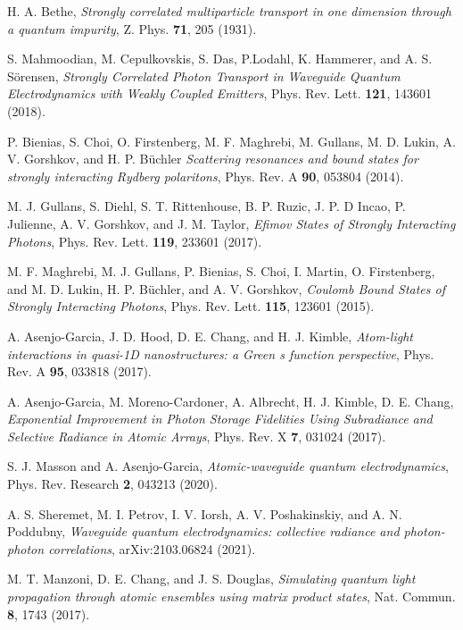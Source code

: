 \documentclass[pra,twocolumn,showpacs,preprintnumbers,amsmath,amssymb]{revtex4-1}
\begin{document}
\begin{thebibliography}{99}
 H. A. Bethe,  \textit{Strongly correlated multiparticle
transport in one dimension through a quantum impurity},   
Z. Phys.  {\bf 71}, 205 (1931).  

 S. Mahmoodian, M. Cepulkovskis, S. Das, P.Lodahl, K. Hammerer, and A. S. S\"orensen, \textit{Strongly Correlated Photon Transport in Waveguide Quantum Electrodynamics with Weakly Coupled Emitters}, Phys. Rev. Lett. {\bf 121}, 143601 (2018).


 P. Bienias, S. Choi, O. Firstenberg, M. F. Maghrebi, M. Gullans, M. D. Lukin, A. V. Gorshkov, and H. P. B\"uchler \textit{Scattering resonances and bound states for strongly interacting Rydberg polaritons},   Phys. Rev. A {\bf 90}, 053804 (2014).

 M. J. Gullans, S. Diehl, S. T. Rittenhouse, B. P. Ruzic, J. P. D Incao, P. Julienne, A. V. Gorshkov, and J. M. Taylor,  \textit{Efimov States of Strongly Interacting Photons}, Phys. Rev. Lett.  {\bf 119}, 233601 (2017).

 M. F. Maghrebi, M. J. Gullans, P. Bienias, S. Choi, I. Martin, O. Firstenberg, and
M. D. Lukin, H. P. B\"uchler,  and A. V. Gorshkov,  \textit{Coulomb Bound States of Strongly Interacting Photons},   Phys. Rev. Lett.  {\bf 115}, 123601 (2015).





 A. Asenjo-Garcia, J. D. Hood,  D. E. Chang, and H. J. Kimble, \textit{Atom-light interactions in quasi-1D nanostructures: a Green s function perspective}, Phys. Rev. A  {\bf95}, 033818 (2017).

 A. Asenjo-Garcia, M. Moreno-Cardoner, A. Albrecht, H. J. Kimble, D. E. Chang,   \textit{Exponential Improvement in Photon Storage Fidelities Using Subradiance and Selective Radiance in Atomic Arrays}, Phys. Rev. X    {\bf 7}, 031024 (2017).



 S. J. Masson and A. Asenjo-Garcia, \textit{Atomic-waveguide quantum electrodynamics}, Phys. Rev. Research  {\bf 2}, 043213 (2020).

 A. S.  Sheremet, M. I. Petrov, I. V. Iorsh, A. V. Poshakinskiy, and A. N. Poddubny, \textit{Waveguide quantum electrodynamics: collective radiance and photon-photon correlations}, arXiv:2103.06824 (2021).

 M. T. Manzoni, D. E. Chang, and J. S. Douglas, \textit{Simulating quantum light propagation through atomic ensembles using matrix product states}, Nat. Commun.  {\bf 8}, 1743 (2017).


\end{thebibliography}
\end{document}
